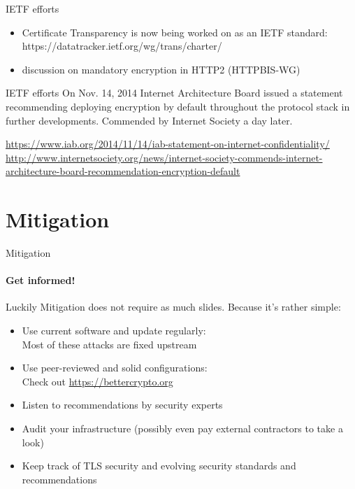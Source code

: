 \documentclass[hyperref={draft}]{beamer}
\begin{document}
\begin{frame}{IETF efforts}
  \begin{itemize}
    \item Certificate Transparency is now being worked on as an IETF standard: https://datatracker.ietf.org/wg/trans/charter/
    \item discussion on mandatory encryption in HTTP2 (HTTPBIS-WG)
  \end{itemize}
\end{frame}

\begin{frame}{IETF efforts}
  On Nov. 14, 2014 Internet Architecture Board issued a statement
  recommending deploying encryption by default throughout the protocol stack in further developments.
  \newline
  \newline
  Commended by Internet Society a day later.
  \vspace{60px}

  \tiny
  \url{https://www.iab.org/2014/11/14/iab-statement-on-internet-confidentiality/}\\
  \url{http://www.internetsociety.org/news/internet-society-commends-internet-architecture-board-recommendation-encryption-default}


\end{frame}

\section{Mitigation}

\begin{frame}{Mitigation}
  \framesubtitle{Get informed!}
  Luckily Mitigation does not require as much slides. Because it's rather simple:
  \begin{itemize}
    \item Use current software and update regularly:\\
      Most of these attacks are fixed upstream
    \item Use peer-reviewed and solid configurations:\\
      Check out \url{https://bettercrypto.org}
    \item Listen to recommendations by security experts
    \item Audit your infrastructure (possibly even pay external contractors to take a look)
    \item Keep track of TLS security and evolving security standards and recommendations
  \end{itemize}
\end{frame}
\end{document}
